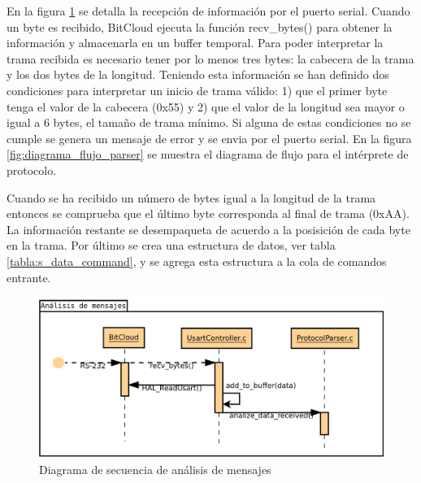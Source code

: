 En la figura \ref{fig:diagrama_secuencia_analisis} se detalla la recepción de información por el puerto serial. Cuando un byte es recibido, BitCloud ejecuta la función recv\_bytes() para obtener la información y almacenarla en un buffer temporal. Para poder interpretar la trama recibida es necesario tener por lo menos tres bytes: la cabecera de la trama y los dos bytes de la longitud. Teniendo esta información se han definido dos condiciones para interpretar un inicio de trama válido: 1) que el primer byte tenga el valor de la cabecera (0x55) y 2) que el valor de la longitud sea mayor o igual a 6 bytes, el tamaño de trama mínimo. Si alguna de estas condiciones no se cumple se genera un mensaje de error y se envia por el puerto serial. En la figura \ref{fig:diagrama_flujo_parser} se muestra el diagrama de flujo para el intérprete de protocolo.

Cuando se ha recibido un número de bytes igual a la longitud de la trama entonces se comprueba que el último byte corresponda al final de trama (0xAA). La información restante se desempaqueta de acuerdo a la posisición de cada byte en la trama. Por último se crea una estructura de datos, ver tabla \ref{tabla:s_data_command}, y se agrega esta estructura a la cola de comandos entrante. 

\begin{figure}
	\centering
	\includegraphics[scale=0.45]{capitulo_3_imgs/analisis_mensajes_secuencia.pdf}
	\caption{Diagrama de secuencia de análisis de mensajes}
	\label{fig:diagrama_secuencia_analisis}
\end{figure}

